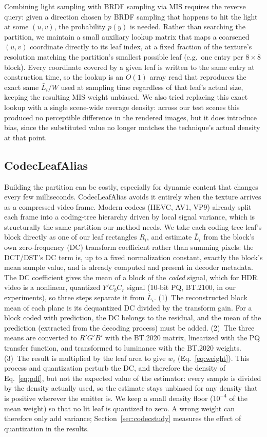 \documentclass[acmtog,review]{acmart}
\begin{document}
Combining light sampling with BRDF sampling via MIS requires the
reverse query: given a direction chosen by BRDF sampling that happens to hit the light at
some $(u,v)$, the probability $p(y)$ is needed. Rather than searching the partition, we
maintain a small auxiliary lookup matrix that maps a coarsened $(u,v)$ coordinate directly to
its leaf index, at a fixed fraction of the texture's resolution matching the partition's
smallest possible leaf (e.g.\ one entry per $8{\times}8$ block).
Every coordinate covered by a given leaf is written to the same entry at
construction time, so the lookup is an $O(1)$ array read that reproduces the exact same
$\bar{L}_i/W$ used at sampling time regardless of that leaf's actual size, keeping the
resulting MIS weight unbiased. We also tried replacing this exact lookup with a single
scene-wide average density: across our test scenes this produced no perceptible difference
in the rendered images, but it does introduce bias, since the substituted value no longer
matches the technique's actual density at that point.

\subsection{CodecLeafAlias}
\label{sec:codec}
Building the partition can be costly, especially for dynamic content that changes every few milliseconds.
CodecLeafAlias avoids it entirely when the texture
arrives as a compressed video frame. Modern codecs (HEVC, AV1, VP9) already split each frame
into a coding-tree hierarchy driven by local signal variance, which is structurally the same
partition our method needs.
We take each coding-tree leaf's block directly as one of our leaf rectangles $R_i$, and
estimate $\bar{L}_i$ from the block's own zero-frequency (DC) transform coefficient rather
than summing pixels: the DCT/DST's DC term is, up to a fixed normalization constant, exactly
the block's mean sample value, and is already computed and present in decoder metadata.
\newbegin
The DC coefficient gives the mean of a block of the \emph{coded} signal, which for HDR video is a nonlinear, quantized $Y'C_bC_r$ signal (10-bit PQ, BT.2100, in our experiments), so three steps separate it from $\bar{L}_i$. (1)~The reconstructed block mean of each plane is its dequantized DC divided by the transform gain. For a block coded with prediction, the DC belongs to the residual, and the mean of the prediction (extracted from the decoding process) must be added. (2)~The three means are converted to $R'G'B'$ with the BT.2020 matrix, linearized with the PQ transfer function, and transformed to luminance with the BT.2020 weights. (3)~The result is multiplied by the leaf area to give $w_i$ (Eq.~\ref{eq:weight}). This process and quantization perturb the DC, and therefore the density of Eq.~\ref{eq:pdf}, but not the expected value of the estimator: every sample is divided by the density actually used, so the estimate stays unbiased for any density that is positive wherever the emitter is. We keep a small density floor ($10^{-4}$ of the mean weight) so that no lit leaf is quantized to zero. A wrong weight can therefore only add variance; Section~\ref{sec:codecstudy} measures the effect of quantization in the results.
\newend
\end{document}

